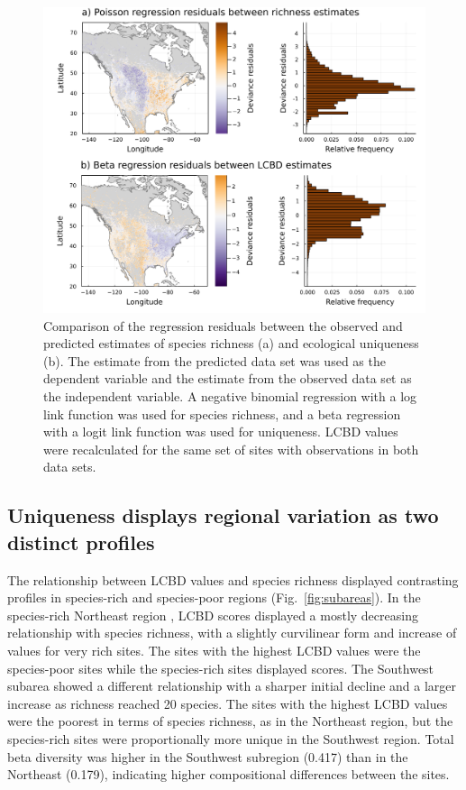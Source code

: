 \documentclass[10pt,oneside]{article}
\makeatletter
\def\maxwidth{\ifdim\Gin@nat@width>\linewidth\linewidth
\else\Gin@nat@width\fi}
\let\Oldincludegraphics\includegraphics
\renewcommand{\includegraphics}[1]{\Oldincludegraphics[width=\maxwidth]{#1}}
\makeatother
\begin{document}
\begin{figure}
\hypertarget{fig:residuals-combined}{%
\centering
\includegraphics{figures/comparison-residuals.png}
\caption{Comparison of the regression residuals between the observed and
predicted estimates of species richness (a) and ecological uniqueness
(b). The estimate from the predicted data set was used as the dependent
variable and the estimate from the observed data set as the independent
variable. A negative binomial regression with a log link function was
used for species richness, and a beta regression with a logit link
function was used for uniqueness. LCBD values were recalculated for the
same set of sites with observations in both data
sets.}\label{fig:residuals-combined}
}
\end{figure}

\hypertarget{uniqueness-displays-regional-variation-as-two-distinct-profiles}{%
\subsection{Uniqueness displays regional variation as two distinct
profiles}\label{uniqueness-displays-regional-variation-as-two-distinct-profiles}}

The relationship between LCBD values and species richness displayed
contrasting profiles in species-rich and species-poor regions
(Fig.~\ref{fig:subareas}). In the species-rich Northeast region , LCBD
scores displayed a mostly decreasing relationship with species richness,
with a slightly curvilinear form and increase of values for very rich
sites. The sites with the highest LCBD values were the species-poor
sites while the species-rich sites displayed scores. The Southwest
subarea showed a different relationship with a sharper initial decline
and a larger increase as richness reached 20 species. The sites with the
highest LCBD values were the poorest in terms of species richness, as in
the Northeast region, but the species-rich sites were proportionally
more unique in the Southwest region. Total beta diversity was higher in
the Southwest subregion (0.417) than in the Northeast (0.179),
indicating higher compositional differences between the sites.
\end{document}
